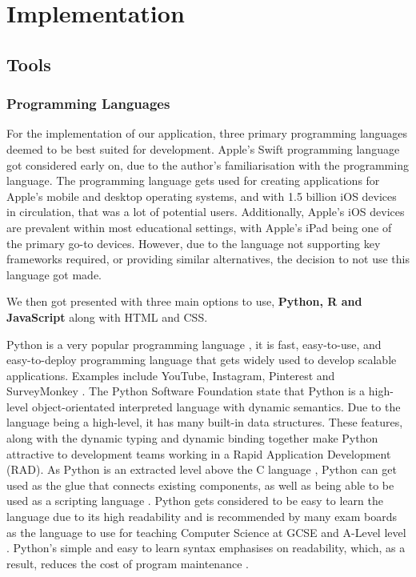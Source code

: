\chapter{Implementation}
	\label{chap:implementation}
	
	\section{Tools}
	
	\subsection{Programming Languages}
	
	For the implementation of our application, three primary programming languages deemed to be best suited for development. Apple's Swift programming language \cite{swift} got considered early on, due to the author's familiarisation with the programming language. The programming language gets used for creating applications for Apple's mobile and desktop operating systems, and with 1.5 billion \cite{9to5mac} iOS devices in circulation, that was a lot of potential users. Additionally, Apple's iOS devices are prevalent within most educational settings, with Apple's iPad being one of the primary go-to devices. However, due to the language not supporting key frameworks required, or providing similar alternatives, the decision to not use this language got made. 
	
	We then got presented with three main options to use, \textbf{Python, R and JavaScript} along with HTML and CSS.
	
	Python is a very popular programming language \cite{wired_python, sof_dev_servay20}, it is fast, easy-to-use, and easy-to-deploy programming language that gets widely used to develop scalable applications. Examples include YouTube, Instagram, Pinterest and SurveyMonkey \cite{hackr.io}. The Python Software Foundation state that Python is a high-level object-orientated interpreted language with dynamic semantics. Due to the language being a high-level, it has many built-in data structures. These features, along with the dynamic typing and dynamic binding together make Python attractive to development teams working in a Rapid Application Development (RAD). As Python is an extracted level above the C language \cite{sto_cpython}, Python can get used as the glue that connects existing components, as well as being able to be used as a scripting language \cite{python_desc}. Python gets considered to be easy to learn the language due to its high readability and is recommended by many exam boards as the language to use for teaching Computer Science at GCSE and A-Level level \cite{list exam boards here}. Python's simple and easy to learn syntax emphasises on readability, which, as a result, reduces the cost of program maintenance \cite{python_desc}. 
	
